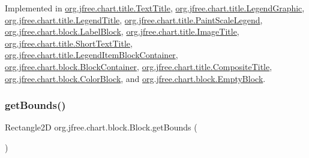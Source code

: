 Implemented in \mbox{\hyperlink{classorg_1_1jfree_1_1chart_1_1title_1_1_text_title_a0c8701f8d3a4844f5de8c08a86a2a652}{org.\+jfree.\+chart.\+title.\+Text\+Title}}, \mbox{\hyperlink{classorg_1_1jfree_1_1chart_1_1title_1_1_legend_graphic_ac29f7144d623700d566b65c515723bef}{org.\+jfree.\+chart.\+title.\+Legend\+Graphic}}, \mbox{\hyperlink{classorg_1_1jfree_1_1chart_1_1title_1_1_legend_title_a006fb515a2acc72597f9355efc99d1c9}{org.\+jfree.\+chart.\+title.\+Legend\+Title}}, \mbox{\hyperlink{classorg_1_1jfree_1_1chart_1_1title_1_1_paint_scale_legend_ac2571d0f330c72c18821cfc2552a6e57}{org.\+jfree.\+chart.\+title.\+Paint\+Scale\+Legend}}, \mbox{\hyperlink{classorg_1_1jfree_1_1chart_1_1block_1_1_label_block_a37ce0083b41db3d2c02e4868476bffaa}{org.\+jfree.\+chart.\+block.\+Label\+Block}}, \mbox{\hyperlink{classorg_1_1jfree_1_1chart_1_1title_1_1_image_title_af625a9d48781190c5c12f5e6293820ea}{org.\+jfree.\+chart.\+title.\+Image\+Title}}, \mbox{\hyperlink{classorg_1_1jfree_1_1chart_1_1title_1_1_short_text_title_a9c5effc8dfa4bf48e1aaf3fa62c3c416}{org.\+jfree.\+chart.\+title.\+Short\+Text\+Title}}, \mbox{\hyperlink{classorg_1_1jfree_1_1chart_1_1title_1_1_legend_item_block_container_a402e56d16b82668ea0cd559504021851}{org.\+jfree.\+chart.\+title.\+Legend\+Item\+Block\+Container}}, \mbox{\hyperlink{classorg_1_1jfree_1_1chart_1_1block_1_1_block_container_ac2c5279f4ac5b5e89e48d11b195938a2}{org.\+jfree.\+chart.\+block.\+Block\+Container}}, \mbox{\hyperlink{classorg_1_1jfree_1_1chart_1_1title_1_1_composite_title_aba3d4ae99c4cebc28b67ca69893bfe83}{org.\+jfree.\+chart.\+title.\+Composite\+Title}}, \mbox{\hyperlink{classorg_1_1jfree_1_1chart_1_1block_1_1_color_block_a7f085b5efe2aeb2fb4d71211be85ee59}{org.\+jfree.\+chart.\+block.\+Color\+Block}}, and \mbox{\hyperlink{classorg_1_1jfree_1_1chart_1_1block_1_1_empty_block_a0b6a2e4523859ae8787ad8ca0221ec47}{org.\+jfree.\+chart.\+block.\+Empty\+Block}}.

\mbox{\label{interfaceorg_1_1jfree_1_1chart_1_1block_1_1_block_a9f7051224aeaddaf2c1099480394dafc}} 
\subsubsection{\texorpdfstring{get\+Bounds()}{getBounds()}}
{\footnotesize\ttfamily Rectangle2D org.\+jfree.\+chart.\+block.\+Block.\+get\+Bounds (\begin{DoxyParamCaption}{ }\end{DoxyParamCaption})}

